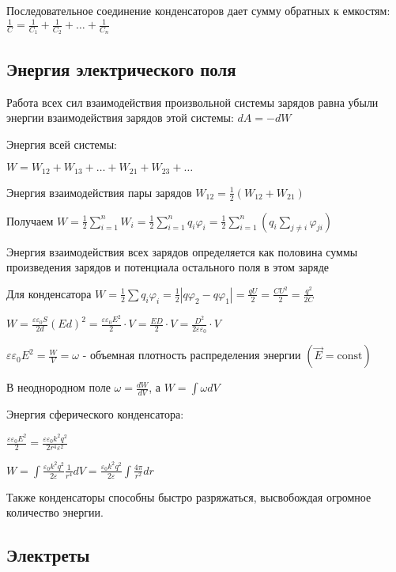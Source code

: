 Последовательное соединение конденсаторов дает сумму обратных к емкостям: $\frac{1}{C} = \frac{1}{C_1} + \frac{1}{C_2} + \dots + \frac{1}{C_n}$

\subsection{Энергия электрического поля}

Работа всех сил взаимодействия произвольной системы зарядов равна убыли энергии взаимодействия зарядов этой системы: $dA = -dW$

Энергия всей системы:

$W = W_{12} + W_{13} + \dots + W_{21} + W_{23} + \dots$

Энергия взаимодействия пары зарядов $W_{12} = \frac{1}{2} (W_{12} + W_{21})$

Получаем $W = \frac{1}{2} \sum_{i = 1}^n W_i = \frac{1}{2} \sum_{i = 1}^n q_i \varphi_i = \frac{1}{2}\sum_{i = 1}^n \left(q_i \sum_{j \neq i} \varphi_{ji}\right)$

Энергия взаимодействия всех зарядов определяется как половина суммы произведения зарядов и потенциала остального поля в этом заряде

Для конденсатора $W = \frac{1}{2} \sum q_i \varphi_i = \frac{1}{2} |q \varphi_2 - q \varphi_1| = \frac{qU}{2} = \frac{CU^2}{2} = \frac{q^2}{2C}$

$W = \frac{\varepsilon \varepsilon_0 S}{2d} (Ed)^2 = \frac{\varepsilon \varepsilon_0 E^2}{2} \cdot V = \frac{E D}{2} \cdot V = \frac{D^2}{2\varepsilon \varepsilon_0} \cdot V$

$\varepsilon \varepsilon_0 E^2 = \frac{W}{V} = \omega$ - объемная плотность распределения энергии $(\vec{E} = \mathrm{const})$

В неоднородном поле $\omega = \frac{dW}{dV}$, а $W = \int \omega dV$

Энергия сферического конденсатора:

$\frac{\varepsilon \varepsilon_0 E^2}{2} = \frac{\varepsilon \varepsilon_0 k^2 q^2}{2r^4 \varepsilon^2}$

$W = \int \frac{\varepsilon_0 k^2 q^2}{2\varepsilon} \frac{1}{r^4} dV = \frac{\varepsilon_0 k^2 q^2}{2\varepsilon} \int \frac{4\pi}{r^2} dr$

Также конденсаторы способны быстро разряжаться, высвобождая огромное количество энергии.

\subsection{Электреты}

